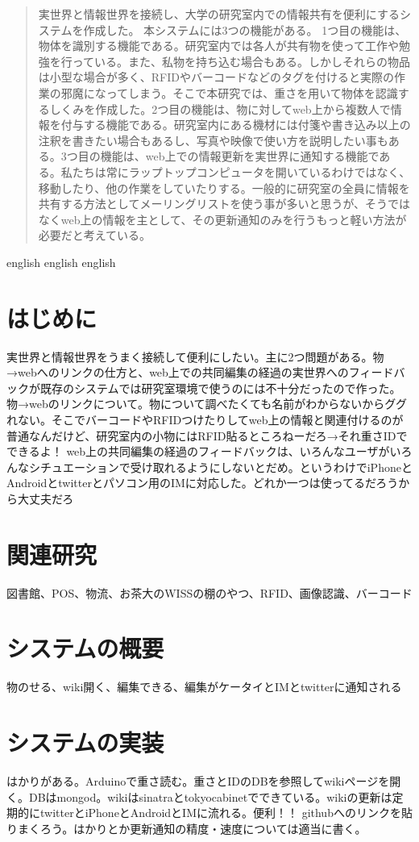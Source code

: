 
\begin{abstract}
実世界と情報世界を接続し、大学の研究室内での情報共有を便利にするシステムを作成した。
本システムには3つの機能がある。
1つ目の機能は、物体を識別する機能である。研究室内では各人が共有物を使って工作や勉強を行っている。また、私物を持ち込む場合もある。しかしそれらの物品は小型な場合が多く、RFIDやバーコードなどのタグを付けると実際の作業の邪魔になってしまう。そこで本研究では、重さを用いて物体を認識するしくみを作成した。2つ目の機能は、物に対してweb上から複数人で情報を付与する機能である。研究室内にある機材には付箋や書き込み以上の注釈を書きたい場合もあるし、写真や映像で使い方を説明したい事もある。3つ目の機能は、web上での情報更新を実世界に通知する機能である。私たちは常にラップトップコンピュータを開いているわけではなく、移動したり、他の作業をしていたりする。一般的に研究室の全員に情報を共有する方法としてメーリングリストを使う事が多いと思うが、そうではなくweb上の情報を主として、その更新通知のみを行うもっと軽い方法が必要だと考えている。
\end{abstract}

\begin{eabstract}
english english english
\end{eabstract}

\maketitle

\section{はじめに}\label{sec:Introduction}
実世界と情報世界をうまく接続して便利にしたい。主に2つ問題がある。物→webへのリンクの仕方と、web上での共同編集の経過の実世界へのフィードバックが既存のシステムでは研究室環境で使うのには不十分だったので作った。
物→webのリンクについて。物について調べたくても名前がわからないからググれない。そこでバーコードやRFIDつけたりしてweb上の情報と関連付けるのが普通なんだけど、研究室内の小物にはRFID貼るところねーだろ→それ重さIDでできるよ！
web上の共同編集の経過のフィードバックは、いろんなユーザがいろんなシチュエーションで受け取れるようにしないとだめ。というわけでiPhoneとAndroidとtwitterとパソコン用のIMに対応した。どれか一つは使ってるだろうから大丈夫だろ


\section{関連研究}
図書館、POS、物流、お茶大のWISSの棚のやつ、RFID、画像認識、バーコード\cite{total}


\section{システムの概要}
物のせる、wiki開く、編集できる、編集がケータイとIMとtwitterに通知される


\section{システムの実装}
はかりがある。Arduinoで重さ読む。重さとIDのDBを参照してwikiページを開く。DBはmongod。wikiはsinatraとtokyocabinetでできている。wikiの更新は定期的にtwitterとiPhoneとAndroidとIMに流れる。便利！！
githubへのリンクを貼りまくろう。はかりとか更新通知の精度・速度については適当に書く。
